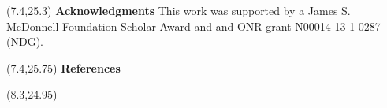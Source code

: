 \documentclass[a0,portrait]{a0poster}
\newcommand{\white}[1]{\textcolor{white}{#1}}
\begin{document}
\begin{textblock}{7}(7.4,25.3)
\small
\textbf{Acknowledgments}
This work was supported by a James S. McDonnell Foundation Scholar Award and and ONR grant N00014-13-1-0287 (NDG).
\end{textblock}


\renewcommand{\refname}{\normalsize References}

\begin{textblock}{7}(7.4,25.75)
\small
\textbf{References}
\end{textblock}

\renewcommand{\refname}{}
\begin{textblock}{6}(8.3,24.95)
\let\bibliographytypesize\scriptsize

  
\end{textblock}




\end{document}
